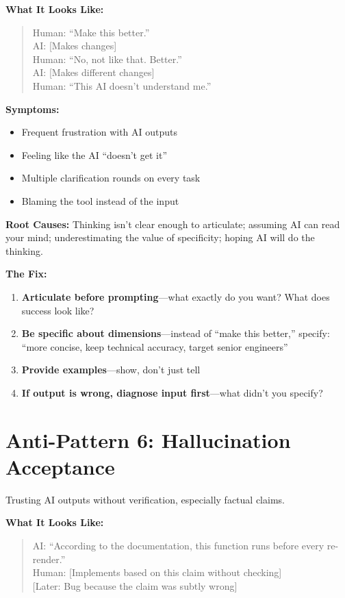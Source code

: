 \textbf{What It Looks Like:}

\begin{quote}
Human: ``Make this better.''\\
AI: [Makes changes]\\
Human: ``No, not like that. Better.''\\
AI: [Makes different changes]\\
Human: ``This AI doesn't understand me.''
\end{quote}

\textbf{Symptoms:}
\begin{itemize}
    \item Frequent frustration with AI outputs
    \item Feeling like the AI ``doesn't get it''
    \item Multiple clarification rounds on every task
    \item Blaming the tool instead of the input
\end{itemize}

\textbf{Root Causes:} Thinking isn't clear enough to articulate; assuming AI can read your mind; underestimating the value of specificity; hoping AI will do the thinking.

\textbf{The Fix:}
\begin{enumerate}
    \item \textbf{Articulate before prompting}---what exactly do you want? What does success look like?
    \item \textbf{Be specific about dimensions}---instead of ``make this better,'' specify: ``more concise, keep technical accuracy, target senior engineers''
    \item \textbf{Provide examples}---show, don't just tell
    \item \textbf{If output is wrong, diagnose input first}---what didn't you specify?
\end{enumerate}

\section{Anti-Pattern 6: Hallucination Acceptance}

Trusting AI outputs without verification, especially factual claims.

\textbf{What It Looks Like:}

\begin{quote}
AI: ``According to the documentation, this function runs before every re-render.''\\
Human: [Implements based on this claim without checking]\\
{[Later: Bug because the claim was subtly wrong]}
\end{quote}

